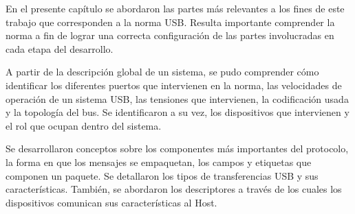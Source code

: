 En el presente capítulo se abordaron las partes más relevantes a los fines de este trabajo que corresponden a la norma USB. Resulta importante comprender la norma a fin de lograr una correcta configuración de las partes involucradas en cada etapa del desarrollo.%

A partir de la descripción global de un sistema, se pudo comprender cómo identificar los diferentes puertos que intervienen en la norma, las velocidades de operación de un sistema USB, las tensiones que intervienen, la codificación usada y la topología del bus. Se identificaron a su vez, los dispositivos que intervienen y el rol que ocupan dentro del sistema.%

Se desarrollaron conceptos sobre los componentes más importantes del protocolo, la forma en que los mensajes se empaquetan, los campos y etiquetas que componen un paquete. Se detallaron los tipos de transferencias USB y sus características. También, se abordaron los descriptores a través de los cuales los dispositivos comunican sus características al Host.
